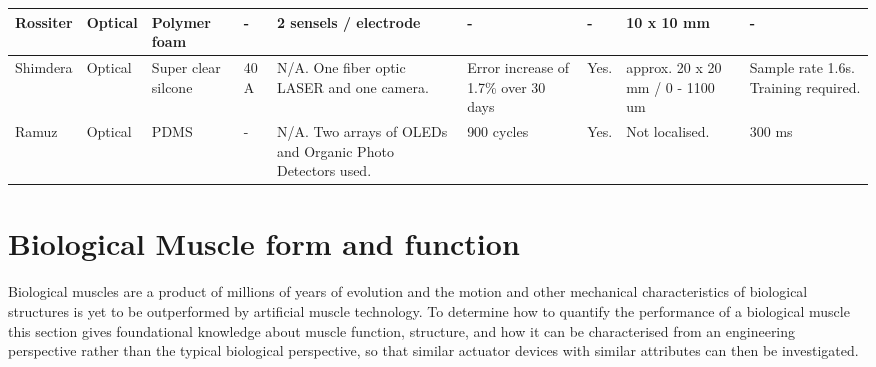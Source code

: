 \begin{landscape}
\begin{table}[H]
\begin{tabular}{|L{2.9cm}|L{2cm}|L{2.5cm}|L{3cm}|L{2.9cm}|L{2cm}|L{3cm}|L{2cm}|L{2cm}|}
				Rossiter\citep{Rossiter2005} & Optical & Polymer foam & - & 2 sensels / electrode & - & - & 10 x 10 mm & - \\ \hline
				Shimdera\citep{Shimadera2022} & Optical & Super clear silcone & 40 A & N/A. One fiber optic LASER and   one camera. & Error increase of 1.7\% over 30   days & Yes. & approx. 20 x 20 mm / 0 - 1100 um & Sample rate 1.6s. Training   required. \\ \hline
				Ramuz\citep{Ramuz2012} & Optical & PDMS & - & N/A. Two arrays of OLEDs and   Organic Photo Detectors used. & 900 cycles & Yes. & Not localised. & 300 ms \\ \hline
			\end{tabular}
		\end{table}
\end{landscape}


%
%


\section{Biological Muscle form and function}

Biological muscles are a product of millions of years of evolution and the motion and other mechanical characteristics of biological structures is yet to be outperformed by artificial muscle technology. To determine how to quantify the performance of a biological muscle this section gives foundational knowledge about muscle function, structure, and how it can be characterised from an engineering perspective rather than the typical biological perspective, so that similar actuator devices with similar attributes can then be investigated.


